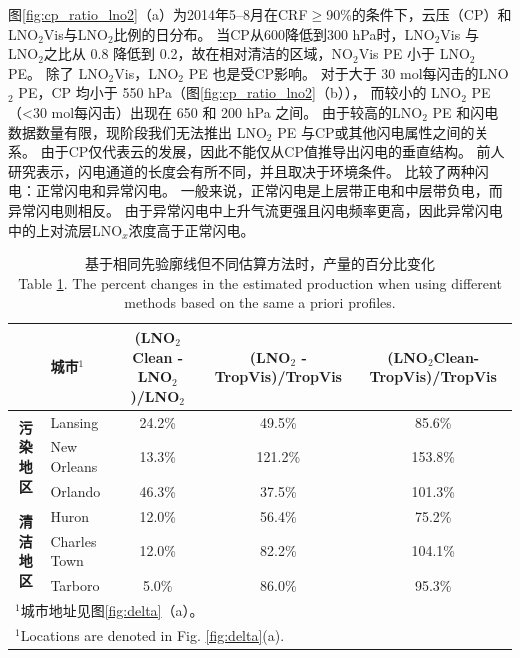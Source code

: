 图\ref{fig:cp_ratio_lno2}（a）为2014年5--8月在CRF$\geq$90\%的条件下，云压（CP）和LNO$_2$Vis与LNO$_2$比例的日分布。
当CP从600降低到300 hPa时，LNO$_2$Vis 与 LNO$_2$之比从 0.8 降低到 0.2，故在相对清洁的区域，NO$_2$Vis PE 小于 LNO$_2$ PE。
除了 LNO$_2$Vis，LNO$_2$ PE 也是受CP影响。
对于大于 30 mol每闪击的LNO$_2$ PE，CP 均小于 550 hPa（图\ref{fig:cp_ratio_lno2}（b）），
而较小的 LNO$_2$ PE（<30 mol每闪击）出现在 650 和 200 hPa 之间。
由于较高的LNO$_2$ PE 和闪电数据数量有限，现阶段我们无法推出 LNO$_2$ PE 与CP或其他闪电属性之间的关系。
由于CP仅代表云的发展，因此不能仅从CP值推导出闪电的垂直结构。
前人研究表示，闪电通道的长度会有所不同，并且取决于环境条件\citep{Carey.2016,Mecikalski.2017,Fuchs.2018}。
\citet{Davis.2019}比较了两种闪电：正常闪电和异常闪电。
一般来说，正常闪电是上层带正电和中层带负电，而异常闪电则相反\citep{Williams.1989}。
由于异常闪电中上升气流更强且闪电频率更高，因此异常闪电中的上对流层LNO$_x$浓度高于正常闪电。


\begin{table}[h]
\scriptsize
\caption{基于相同先验廓线但不同估算方法时，产量的百分比变化\\Table \ref{table:production_comp}. The percent changes in the estimated production when using different methods based on the same a priori profiles.}
\begin{tabular}{clccc}
\hline
\textbf{} & \textbf{城市$^1$} & \textbf{(LNO$_\textrm{2}$Clean - LNO$_\textrm{2}$)/LNO$_\textrm{2}$} & \textbf{(LNO$_\textrm{2}$ - TropVis)/TropVis} & \textbf{(LNO$_\textrm{2}$Clean-TropVis)/TropVis} \\
\hline
\multirow{3}{*}{\textbf{污染地区}} & Lansing          & 24.2\%  & 49.5\%   & 85.6\%   \\
                                   & New Orleans      & 13.3\%  & 121.2\%  & 153.8\%  \\
                                   & Orlando          & 46.3\%  & 37.5\%   & 101.3\%  \\
\hline
\multirow{3}{*}{\textbf{清洁地区}}    & Huron            & 12.0\%  & 56.4\%   & 75.2\%   \\
                                   & Charles Town     & 12.0\%  & 82.2\%   & 104.1\%  \\
                                   & Tarboro          & 5.0\%   & 86.0\%   & 95.3\%   \\
\hline
\multicolumn{5}{l}{$^1$城市地址见图\ref{fig:delta}（a）。}\\
\multicolumn{5}{l}{$^1$Locations are denoted in Fig. \ref{fig:delta}(a).}
\end{tabular}
\label{table:production_comp}
\end{table}


